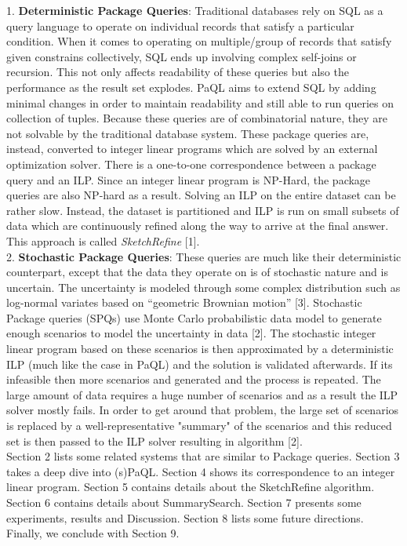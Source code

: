 \documentclass[a4paper,12pt]{article}
\begin{document}
1. {\small \textbf{Deterministic Package Queries}}: Traditional databases rely on SQL as a query language to operate on individual records that satisfy a particular condition. When it comes to operating on multiple/group of records that satisfy given constrains collectively, SQL ends up involving complex self-joins or recursion. This not only affects readability of these queries but also the performance as the result set explodes. PaQL aims to extend SQL by adding minimal changes in order to maintain readability and still able to run queries on collection of tuples. Because these queries are of combinatorial nature, they are not solvable by the traditional database system. These package queries are, instead, converted to integer linear programs which are solved by an external optimization solver. There is a one-to-one correspondence between a package query and an ILP. Since an integer linear program is NP-Hard, the package queries are also NP-hard as a result. Solving an ILP on the entire dataset can be rather slow. Instead, the dataset is partitioned and ILP is run on small subsets of data which are continuously refined along the way to arrive at the final answer. This approach is called \textit{SketchRefine} [1].
\\

2. \textbf{Stochastic Package Queries}: These queries are much like their deterministic counterpart, except that the data they operate on is of stochastic nature and is uncertain. The uncertainty is modeled through some complex distribution such as log-normal variates based on “geometric Brownian motion” [3]. Stochastic Package queries (SPQs) use Monte Carlo probabilistic data model to generate enough scenarios to model the uncertainty in data [2]. The stochastic integer linear program based on these scenarios is then approximated by a deterministic ILP (much like the case in PaQL) and the solution is validated afterwards. If its infeasible then more scenarios and generated and the process is repeated. The large amount of data requires a huge number of scenarios and as a result the ILP solver mostly fails. In order to get around that problem, the large set of scenarios is replaced by a well-representative "summary" of the scenarios and this reduced set is then passed to the ILP solver resulting in  algorithm [2].
\\

Section 2 lists some related systems that are similar to Package queries. Section 3 takes a deep dive into (s)PaQL. Section 4 shows its correspondence to an integer linear program. Section 5 contains details about the SketchRefine algorithm. Section 6 contains details about SummarySearch. Section 7 presents some experiments, results and Discussion. Section 8 lists some future directions. Finally, we conclude with Section 9.
\end{document}
